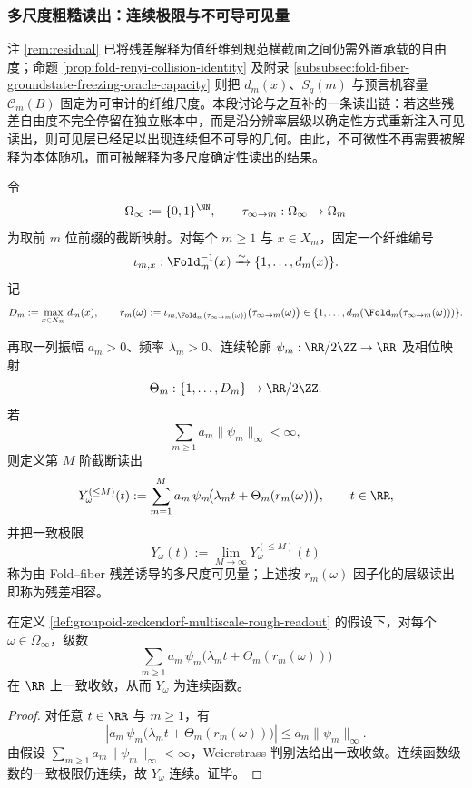 \subsubsection{多尺度粗糙读出：连续极限与不可导可见量}\label{subsubsec:groupoid-zeckendorf-multiscale-rough-readout}

注 \ref{rem:residual} 已将残差解释为值纤维到规范横截面之间仍需外置承载的自由度；命题 \ref{prop:fold-renyi-collision-identity} 及附录 \ref{subsubsec:fold-fiber-groundstate-freezing-oracle-capacity} 则把 \(d_m(x)\)、\(S_q(m)\) 与预言机容量 \(\mathcal C_m(B)\) 固定为可审计的纤维尺度。本段讨论与之互补的一条读出链：若这些残差自由度不完全停留在独立账本中，而是沿分辨率层级以确定性方式重新注入可见读出，则可见层已经足以出现连续但不可导的几何。由此，不可微性不再需要被解释为本体随机，而可被解释为多尺度确定性读出的结果。

\begin{definition}[残差相容的多尺度可见读出]\label{def:groupoid-zeckendorf-multiscale-rough-readout}
令
\[
\Omega_\infty:=\{0,1\}^{\NN},
\qquad
\tau_{\infty\to m}:\Omega_\infty\to \Omega_m
\]
为取前 \(m\) 位前缀的截断映射。对每个 \(m\ge 1\) 与 \(x\in X_m\)，固定一个纤维编号
\[
\iota_{m,x}:\Fold_m^{-1}(x)\xrightarrow{\sim}\{1,\dots,d_m(x)\}.
\]
记
\[
D_m:=\max_{x\in X_m}d_m(x),
\qquad
r_m(\omega):=
\iota_{m,\Fold_m(\tau_{\infty\to m}(\omega))}
\bigl(\tau_{\infty\to m}(\omega)\bigr)
\in \{1,\dots,d_m(\Fold_m(\tau_{\infty\to m}(\omega)))\}.
\]

再取一列振幅 \(a_m>0\)、频率 \(\lambda_m>0\)、连续轮廓 \(\psi_m:\RR/2\ZZ\to\RR\) 及相位映射
\[
\Theta_m:\{1,\dots,D_m\}\to \RR/2\ZZ.
\]
若
\[
\sum_{m\ge 1} a_m\|\psi_m\|_\infty<\infty,
\]
则定义第 \(M\) 阶截断读出
\[
Y_\omega^{(\le M)}(t):=
\sum_{m=1}^{M}
a_m\,
\psi_m\!\bigl(\lambda_m t+\Theta_m(r_m(\omega))\bigr),
\qquad t\in\RR,
\]
并把一致极限
\[
Y_\omega(t):=\lim_{M\to\infty}Y_\omega^{(\le M)}(t)
\]
称为由 Fold--fiber 残差诱导的多尺度可见量；上述按 \(r_m(\omega)\) 因子化的层级读出即称为残差相容。
\end{definition}

\begin{proposition}[连续极限的存在]\label{prop:groupoid-zeckendorf-multiscale-rough-readout-continuity}
在定义 \ref{def:groupoid-zeckendorf-multiscale-rough-readout} 的假设下，对每个 \(\omega\in\Omega_\infty\)，级数
\[
\sum_{m\ge 1}
a_m\,
\psi_m\!\bigl(\lambda_m t+\Theta_m(r_m(\omega))\bigr)
\]
在 \(\RR\) 上一致收敛，从而 \(Y_\omega\) 为连续函数。
\end{proposition}
\begin{proof}
对任意 \(t\in\RR\) 与 \(m\ge 1\)，有
\[
\left|
a_m\,
\psi_m\!\bigl(\lambda_m t+\Theta_m(r_m(\omega))\bigr)
\right|
\le
a_m\|\psi_m\|_\infty.
\]
由假设 \(\sum_{m\ge 1} a_m\|\psi_m\|_\infty<\infty\)，Weierstrass 判别法给出一致收敛。连续函数级数的一致极限仍连续，故 \(Y_\omega\) 连续。证毕。
\end{proof}

